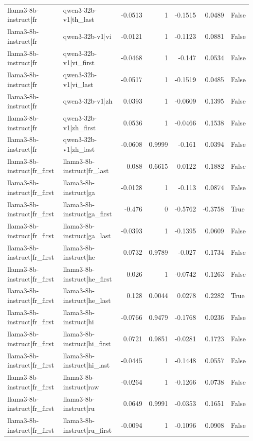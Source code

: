 \begin{table}
\begin{tabular}{l l r r r r l}
llama3-8b-instruct|fr & qwen3-32b-v1|th_last & -0.0513 & 1 & -0.1515 & 0.0489 & False \\
llama3-8b-instruct|fr & qwen3-32b-v1|vi & -0.0121 & 1 & -0.1123 & 0.0881 & False \\
llama3-8b-instruct|fr & qwen3-32b-v1|vi_first & -0.0468 & 1 & -0.147 & 0.0534 & False \\
llama3-8b-instruct|fr & qwen3-32b-v1|vi_last & -0.0517 & 1 & -0.1519 & 0.0485 & False \\
llama3-8b-instruct|fr & qwen3-32b-v1|zh & 0.0393 & 1 & -0.0609 & 0.1395 & False \\
llama3-8b-instruct|fr & qwen3-32b-v1|zh_first & 0.0536 & 1 & -0.0466 & 0.1538 & False \\
llama3-8b-instruct|fr & qwen3-32b-v1|zh_last & -0.0608 & 0.9999 & -0.161 & 0.0394 & False \\
llama3-8b-instruct|fr_first & llama3-8b-instruct|fr_last & 0.088 & 0.6615 & -0.0122 & 0.1882 & False \\
llama3-8b-instruct|fr_first & llama3-8b-instruct|ga & -0.0128 & 1 & -0.113 & 0.0874 & False \\
llama3-8b-instruct|fr_first & llama3-8b-instruct|ga_first & -0.476 & 0 & -0.5762 & -0.3758 & True \\
llama3-8b-instruct|fr_first & llama3-8b-instruct|ga_last & -0.0393 & 1 & -0.1395 & 0.0609 & False \\
llama3-8b-instruct|fr_first & llama3-8b-instruct|he & 0.0732 & 0.9789 & -0.027 & 0.1734 & False \\
llama3-8b-instruct|fr_first & llama3-8b-instruct|he_first & 0.026 & 1 & -0.0742 & 0.1263 & False \\
llama3-8b-instruct|fr_first & llama3-8b-instruct|he_last & 0.128 & 0.0044 & 0.0278 & 0.2282 & True \\
llama3-8b-instruct|fr_first & llama3-8b-instruct|hi & -0.0766 & 0.9479 & -0.1768 & 0.0236 & False \\
llama3-8b-instruct|fr_first & llama3-8b-instruct|hi_first & 0.0721 & 0.9851 & -0.0281 & 0.1723 & False \\
llama3-8b-instruct|fr_first & llama3-8b-instruct|hi_last & -0.0445 & 1 & -0.1448 & 0.0557 & False \\
llama3-8b-instruct|fr_first & llama3-8b-instruct|raw & -0.0264 & 1 & -0.1266 & 0.0738 & False \\
llama3-8b-instruct|fr_first & llama3-8b-instruct|ru & 0.0649 & 0.9991 & -0.0353 & 0.1651 & False \\
llama3-8b-instruct|fr_first & llama3-8b-instruct|ru_first & -0.0094 & 1 & -0.1096 & 0.0908 & False \\

\end{tabular}
\end{table}
